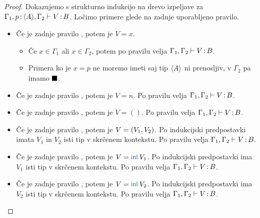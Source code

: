 \begin{proof}
	Dokazujemo s strukturno indukcijo na drevo izpeljave za $\Gamma_1, p \mathinner{:} \langle A \rangle, \Gamma_2 \vdash V \mathinner{:} B$.
	Ločimo primere glede na zadnje uporabljeno pravilo.
	
	\begin{itemize}
		\item[\sitem] Če je zadnje pravilo , potem je $V = x$.
		\begin{itemize}
			\item Če $x \in \Gamma_1$ ali $x \in \Gamma_2$, potem po pravilu  velja $\Gamma_1, \Gamma_2 \vdash V \mathinner{:} B$.
			
			\item Primera ko je $x = p$ ne moremo imeti saj tip $\langle A \rangle$ ni prenosljiv, v $\Gamma_2$ pa imamo $\blacksquare$.
		\end{itemize}
		
		\item Če je zadnje pravilo , potem je $V = n$. Po pravilu  velja $\Gamma_1, \Gamma_2 \vdash V \mathinner{:} B$.

		\item Če je zadnje pravilo , potem je $V = ()$. Po pravilu  velja $\Gamma_1, \Gamma_2 \vdash V \mathinner{:} B$.
		
		\item Če je zadnje pravilo , potem je $V =( V_1 , V_2 )$.
		Po indukcijski predpostavki imata $V_1$ in $V_2$ isti tip v skrčenem kontekstu.
		Po pravilu  velja $\Gamma_1, \Gamma_2 \vdash V \mathinner{:} B$.
		
		\item Če je zadnje pravilo , potem je $V = \tminl{V_1}$.
		Po indukcijski predpostavki ima $V_1$ isti tip v skrčenem kontekstu.
		Po pravilu  velja $\Gamma_1, \Gamma_2 \vdash V \mathinner{:} B$.
		
		\item Če je zadnje pravilo , potem je $V = \tminl{V_2}$.
		Po indukcijski predpostavki ima $V_2$ isti tip v skrčenem kontekstu.
		Po pravilu  velja $\Gamma_1, \Gamma_2 \vdash V \mathinner{:} B$.
		

\end{itemize}
\end{proof}
